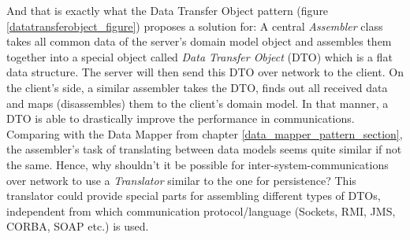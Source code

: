And that is exactly what the Data Transfer Object pattern (figure \ref{datatransferobject_figure})
proposes a solution for: A central \emph{Assembler} class takes all common data
of the server's domain model object and assembles them together into a special
object called \emph{Data Transfer Object} (DTO) which is a flat data structure.
The server will then send this DTO over network to the client. On the client's side,
a similar assembler takes the DTO, finds out all received data and maps (disassembles) them to the
client's domain model. In that manner, a DTO is able to drastically improve the performance
in communications.\\
Comparing with the Data Mapper from chapter \ref{data_mapper_pattern_section},
the assembler's task of translating between data models seems quite similar if
not the same. Hence, why shouldn't it be possible for inter-system-communications
over network to use a \emph{Translator} similar to the one for persistence?
This translator could provide special parts for assembling different types of
DTOs, independent from which communication protocol/language (Sockets, RMI, JMS,
CORBA, SOAP etc.) is used.
